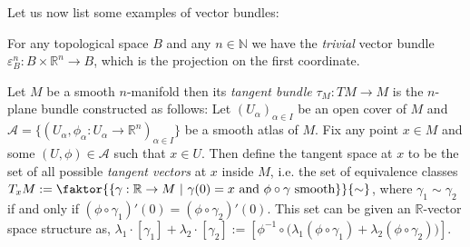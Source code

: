 Let us now list some examples of vector bundles:
\begin{examples}\label{ex:vector_bundles}
\begin{i_enum}
\item For any topological space $B$ and any $n\in\mathbb{N}$ we have the \emph{trivial} vector bundle
$\varepsilon_B^n:B\times\mathbb{R}^n\to B$,
which is the projection on the first coordinate.
\item Let $M$ be a smooth $n$-manifold then its \emph{tangent bundle} $\tau_M:TM\to M$ is the $n$-plane bundle constructed as follows: Let $(U_{\alpha})_{\alpha\in I}$ be an open cover of $M$ and $\mathcal{A}=\big\{(U_{\alpha},\phi_{\alpha}:U_{\alpha}\to\mathbb{R}^n)_{\alpha\in I}\big\}$ be a smooth atlas of $M$. Fix any point $x\in M$ and some $(U,\phi)\in\mathcal{A}$ such that $x\in U$. Then define the tangent space at $x$ to be the set of all possible \emph{tangent vectors} at $x$ inside $M$, i.e. the set of equivalence classes
$T_xM:=\faktor{\left\{\gamma:\mathbb{R}\to M\ |\ \gamma(0)=x\text{ and }\phi\circ\gamma\text{ smooth}\right\}}{\sim}$,
where $\gamma_1\sim\gamma_2$ if and only if $(\phi\circ\gamma_1)'(0)=(\phi\circ\gamma_2)'(0)$. This set can be given an $\mathbb{R}$-vector space structure as,
$\lambda_1\cdot[\gamma_1]+\lambda_2\cdot[\gamma_2]:=\left[\phi^{-1}\circ\big(\lambda_1(\phi\circ\gamma_1)+\lambda_2(\phi\circ\gamma_2)\big)\right]$.


\end{i_enum}
\end{examples}
